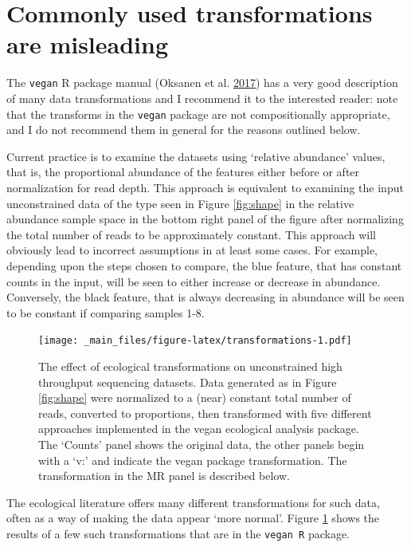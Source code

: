 \documentclass[onecolumn]{book}
\theoremstyle{definition}
\theoremstyle{definition}
\theoremstyle{definition}
\theoremstyle{remark}
\begin{document}
\hypertarget{commonly-used-transformations-are-misleading}{%
\section{Commonly used transformations are
misleading}\label{commonly-used-transformations-are-misleading}}

The \texttt{vegan} R package manual (Oksanen et al.
\protect\hyperlink{ref-vegan:2017}{2017}) has a very good description of
many data transformations and I recommend it to the interested reader:
note that the transforms in the \texttt{vegan} package are not
compositionally appropriate, and I do not recommend them in general for
the reasons outlined below.

Current practice is to examine the datasets using `relative abundance'
values, that is, the proportional abundance of the features either
before or after normalization for read depth. This approach is
equivalent to examining the input unconstrained data of the type seen in
Figure \ref{fig:shape} in the relative abundance sample space in the
bottom right panel of the figure after normalizing the total number of
reads to be approximately constant. This approach will obviously lead to
incorrect assumptions in at least some cases. For example, depending
upon the steps chosen to compare, the blue feature, that has constant
counts in the input, will be seen to either increase or decrease in
abundance. Conversely, the black feature, that is always decreasing in
abundance will be seen to be constant if comparing samples 1-8.

\begin{figure}
\centering
\texttt{[image: \_main\_files/figure-latex/transformations-1.pdf]}
\caption{\label{fig:transformations}The effect of ecological transformations
on unconstrained high throughput sequencing datasets. Data generated as
in Figure \ref{fig:shape} were normalized to a (near) constant total
number of reads, converted to proportions, then transformed with five
different approaches implemented in the vegan ecological analysis
package. The `Counts' panel shows the original data, the other panels
begin with a `v:' and indicate the vegan package transformation. The
transformation in the MR panel is described below.}
\end{figure}

The ecological literature offers many different transformations for such
data, often as a way of making the data appear `more normal'. Figure
\ref{fig:transformations} shows the results of a few such
transformations that are in the \texttt{vegan\ R} package.
\end{document}
